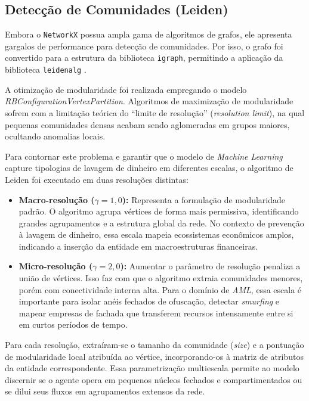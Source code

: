 \documentclass[a4paper,12pt,oneside,onecolumn,final,fleqn]{repUERJ}
\begin{document}
\subsection{Detecção de Comunidades (Leiden)}

Embora o \texttt{NetworkX} possua ampla gama de algoritmos de grafos, ele apresenta gargalos de performance para detecção de comunidades. Por isso, o grafo foi convertido para a estrutura da biblioteca \texttt{igraph}, permitindo a aplicação da biblioteca \texttt{leidenalg} \cite{traag2019leiden}.

A otimização de modularidade foi realizada empregando o modelo \textit{RBConfigurationVertexPartition}. Algoritmos de maximização de modularidade sofrem com a limitação teórica do ``limite de resolução'' (\textit{resolution limit}), na qual pequenas comunidades densas acabam sendo aglomeradas em grupos maiores, ocultando anomalias locais.

Para contornar este problema e garantir que o modelo de \textit{Machine Learning} capture tipologias de lavagem de dinheiro em diferentes escalas, o algoritmo de Leiden foi executado em duas resoluções distintas:

\begin{itemize}
    \item \textbf{Macro-resolução ($\gamma = 1{,}0$):} Representa a formulação de modularidade padrão. O algoritmo agrupa vértices de forma mais permissiva, identificando grandes agrupamentos e a estrutura global da rede. No contexto de prevenção à lavagem de dinheiro, essa escala mapeia ecossistemas econômicos amplos, indicando a inserção da entidade em macroestruturas financeiras.
    
    \item \textbf{Micro-resolução ($\gamma = 2{,}0$):} Aumentar o parâmetro de resolução penaliza a união de vértices. Isso faz com que o algoritmo extraia comunidades menores, porém com conectividade interna alta. Para o domínio de \textit{AML}, essa escala é importante para isolar anéis fechados de ofuscação, detectar \textit{smurfing} e mapear empresas de fachada que transferem recursos intensamente entre si em curtos períodos de tempo.
\end{itemize}

Para cada resolução, extraíram-se o tamanho da comunidade (\textit{size}) e a pontuação de modularidade local atribuída ao vértice, incorporando-os à matriz de atributos da entidade correspondente. Essa parametrização multiescala permite ao modelo discernir se o agente opera em pequenos núcleos fechados e compartimentados ou se dilui seus fluxos em agrupamentos extensos da rede.
\end{document}
